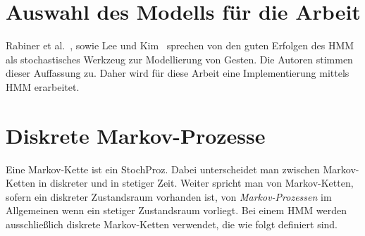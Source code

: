 \section{Auswahl des Modells f\"ur die Arbeit}
Rabiner et al.~\cite[S.~257f]{bib:hmmrabiner}, sowie Lee und Kim~\cite[S.~961]{bib:hmmlee} sprechen von den guten Erfolgen des \gls{HMM} als stochastisches Werkzeug zur Modellierung von Gesten. Die Autoren stimmen dieser Auffassung zu. Daher wird f\"ur diese Arbeit eine Implementierung mittels \acrshort{HMM} erarbeitet.

\section{Diskrete Markov-Prozesse}
\label{subsec:MarkovKette}
Eine Markov-Kette ist ein \gls{StochProz}. Dabei unterscheidet man zwischen Markov-Ketten in diskreter und in stetiger Zeit. Weiter spricht man von Markov-Ketten, sofern ein diskreter Zustandsraum vorhanden ist, von \textit{Markov-Prozessen} im Allgemeinen wenn ein stetiger Zustandsraum vorliegt.
\newline
Bei einem \acrshort{HMM} werden ausschlie\ss lich diskrete Markov-Ketten verwendet, die wie folgt definiert sind.

